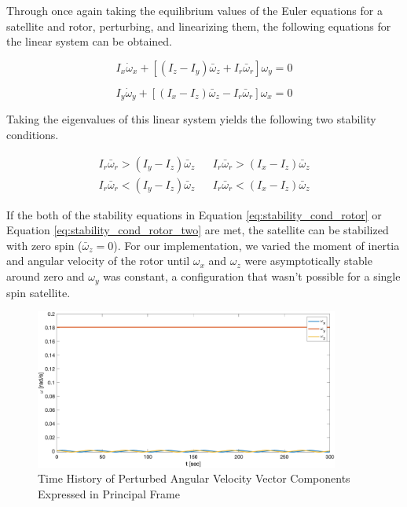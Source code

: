 Through once again taking the equilibrium values of the Euler equations for a satellite and rotor, perturbing, and linearizing them, the following equations for the linear system can be obtained.

\begin{equation}
    I_x \dot \omega_x + \left [ (I_z - I_y) \bar{\omega}_z + I_r \bar{\omega}_r \right] \omega_y = 0
\end{equation}

\begin{equation*}
    I_y \dot \omega_y + \left [ (I_x - I_z) \bar{\omega}_z - I_r \bar{\omega}_r \right] \omega_x = 0
\end{equation*}

Taking the eigenvalues of this linear system yields the following two stability conditions.

\begin{align} \label{eq:stability_cond_rotor}
    I_r \bar{\omega}_r > (I_y - I_z) \bar{\omega}_z && I_r \bar{\omega}_r > (I_x - I_z) \bar{\omega}_z \\
    \label{eq:stability_cond_rotor_two}
    I_r \bar{\omega}_r < (I_y - I_z) \bar{\omega}_z && I_r \bar{\omega}_r < (I_x - I_z) \bar{\omega}_z
\end{align}

If the both of the stability equations in Equation \ref{eq:stability_cond_rotor} or Equation \ref{eq:stability_cond_rotor_two} are met, the satellite can be stabilized with zero spin ($\bar{\omega}_z = 0$). For our implementation, we varied the moment of inertia and angular velocity of the rotor until $\omega_x$ and $\omega_z$ were asymptotically stable around zero and $\omega_y$ was constant, a configuration that wasn't possible for a single spin satellite.

\begin{figure}[H]
    \centering
    \captionsetup{ justification = centering}
    \includegraphics[width = 10cm]{Images/PS4/mom_wheel_intermediate_stability_history_velocity.png}
    \caption{Time History of Perturbed Angular Velocity Vector Components Expressed in Principal Frame}
    \label{fig:mom_wheel_intermediate_stability_velocities}
\end{figure}

